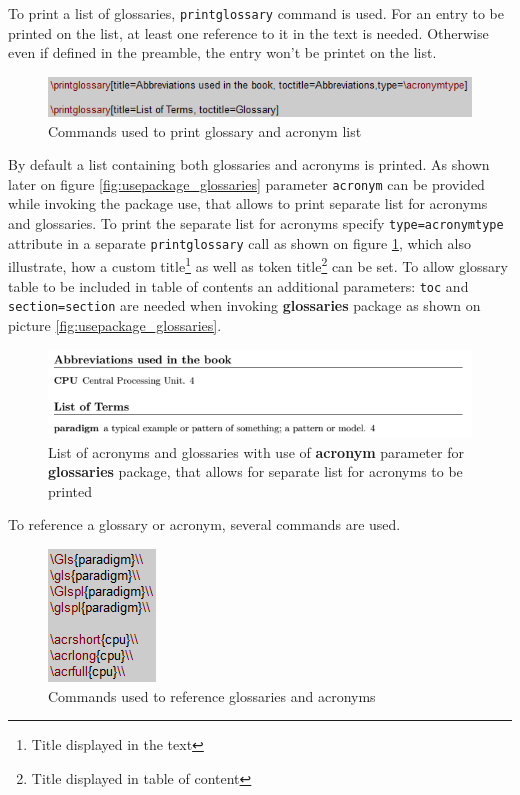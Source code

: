 To print a list of glossaries, \texttt{\bs printglossary} command is used. For an entry to be printed on the list, at least one reference to it in the text is needed. Otherwise even if defined in the preamble, the entry won't be printet on the list.

\begin{figure}[H]
\centering
\includegraphics[scale=1.0]{LaTeX/figures/printglossary.png}
\caption{Commands used to print glossary and acronym list}
\label{fig:printglossary}
\end{figure}

By default a list containing both glossaries and acronyms is printed. As shown later on figure \ref{fig:usepackage_glossaries} parameter \texttt{acronym} can be provided while invoking the package use, that allows to print separate list for acronyms and glossaries. To print the separate list for acronyms specify \texttt{type=\bs acronymtype} attribute in a separate \texttt{\bs printglossary} call as shown on figure \ref{fig:printglossary}, which also illustrate, how a custom title\footnote{Title displayed in the text} as well as token title\footnote{Title displayed in table of content} can be set. To allow glossary table to be included in table of contents an additional parameters: \texttt{toc} and \texttt{section=section} are needed when invoking \textbf{glossaries} package as shown on picture \ref{fig:usepackage_glossaries}.

\begin{figure}[H]
\centering
\includegraphics[scale=0.8]{LaTeX/figures/glossary_types.png}
\caption{List of acronyms and glossaries with use of \textbf{acronym} parameter for \textbf{glossaries} package, that allows for separate list for acronyms to be printed}
\end{figure}

To reference a glossary or acronym, several commands are used.

\begin{figure}[H]
\centering
\includegraphics[scale=1.0]{LaTeX/figures/reference_glossaries.png}
\caption{Commands used to reference glossaries and acronyms}
\end{figure}

